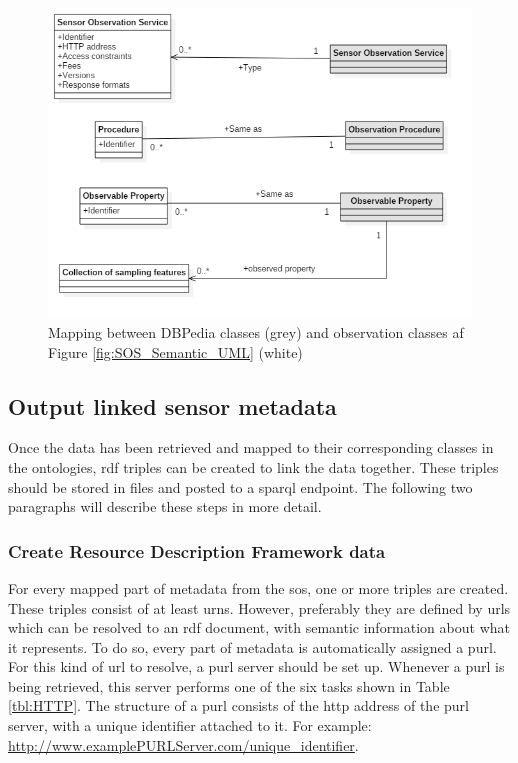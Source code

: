  \begin{figure}
 	\centering
 	\includegraphics[width=0.9\linewidth]{UML/DBPedia_to_SKB.PNG}
 	\caption{Mapping between DBPedia classes (grey) and observation classes af Figure \ref{fig:SOS_Semantic_UML} (white)}
 	\label{fig:SOS_DBPedia}
 \end{figure}

\subsection{Output linked sensor metadata}
\label{par:publishLD}

Once the data has been retrieved and mapped to their corresponding classes in the ontologies, \ac{rdf} triples can be created to link the data together. These triples should be stored in files and posted to a \ac{sparql} endpoint. The following two paragraphs will describe these steps in more detail.


\subsubsection{Create Resource Description Framework data}
\label{par:createRDF}
For every mapped part of metadata from the \ac{sos}, one or more triples are created. These triples consist of at least \aclp{urn}. However, preferably they are defined by \aclp{url} which can be resolved to an \ac{rdf} document, with semantic information about what it represents. To do so, every part of metadata is automatically assigned a \acf{purl}. For this kind of \ac{url} to resolve, a \ac{purl} server should be set up. Whenever a \ac{purl} is being retrieved, this server performs one of the six tasks shown in Table \ref{tbl:HTTP}. The structure of a \ac{purl} consists of the \ac{http} address of the \ac{purl} server, with a unique identifier attached to it. For example: \url{http://www.examplePURLServer.com/unique\_identifier}. 

